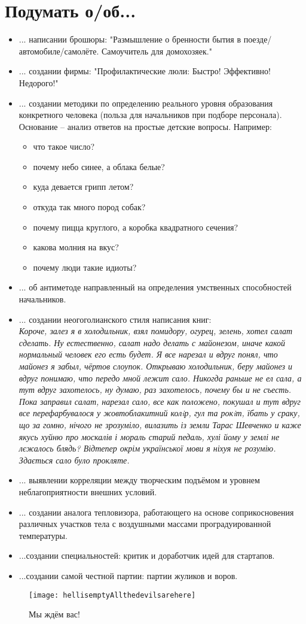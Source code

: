 \section{Подумать о/об...}
\begin{itemize}
\item ... написании брошюры: "Размышление о бренности бытия в поезде/автомобиле/самолёте. Самоучитель для домохозяек."
\item ... создании фирмы: "Профилактические люли: Быстро! Эффективно! Недорого!"
\item ...  создании методики по определению реального уровня образования конкретного человека (польза для начальников при подборе персонала). Основание -- анализ ответов на простые детские вопросы.
Например:
    \begin{itemize}
        \item что такое число?
        \item почему небо синее, а облака белые?
        \item куда девается грипп летом?
        \item откуда так много пород собак?
        \item почему пицца круглого, а коробка квадратного сечения?
        \item какова молния на вкус?
        \item почему люди такие идиоты?
    \end{itemize}
\item ... об антиметоде направленный на определения умственных способностей начальников.    
\item ... создании неогоголианского стиля написания книг:\\
    \emph{Короче, залез я в холодильник, взял помидору, огурец, зелень, хотел салат сделать. Ну естественно, 
        салат надо делать с майонезом, иначе какой нормальный человек его есть будет. Я все нарезал и вдруг 
        понял, что майонез я забыл, чёртов слоупок. Открываю холодильник, беру майонез и вдруг понимаю, что 
        передо мной лежит сало. Никогда раньше не ел сала, а тут вдруг захотелось, ну думаю, раз захотелось, 
        почему бы и не съесть. Пока заправил салат, нарезал сало, все как положено, покушал и тут вдруг все 
        перефарбувалося у жовтоблакитний колiр, гул та рокiт, їбать у сраку, що за гомно, нічого не 
        зрозуміло, вилазить із земли Тарас Шевченко и каже якусь хуйню про москалів і мораль старий педаль, 
        хулі йому у землі не лєжалось блядь? Відтепер окрім української мови я ніхуя не розумію. Здається 
        сало було прокляте.}
\item ... выявлении корреляции между творческим подъёмом и уровнем неблагоприятности внешних условий.
\item ... создании аналога тепловизора, работающего на основе соприкосновения различных участков тела с воздушными массами проградуированной температуры.
\item ...создании специальностей: критик и доработчик идей для стартапов.
\item ...создании самой честной партии: партии жуликов и воров.
\end{itemize}
\begin{figure}[ht!]
    \centering
    \texttt{[image: hellisemptyAllthedevilsarehere]}
    \caption{Мы ждём вас!}
\end{figure}
